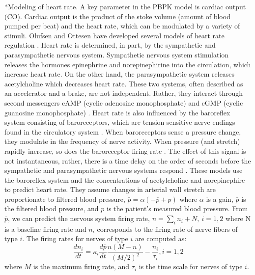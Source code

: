 \documentclass[11pt]{article}
\makeatletter
\renewcommand\subsection{\@startsection
	{subsection}{2}{0mm}
	{-0.05in}
	{-0.5\baselineskip}
	{\normalfont\normalsize\bfseries}}
\makeatother
\begin{document}
\subsection*{Modeling of heart rate.}
A key parameter in the PBPK model is cardiac output (CO). Cardiac output is the product of the stoke volume (amount of blood pumped per beat) and the heart rate, which can be modulated by a variety of stimuli. Olufsen and Ottesen have developed several models of heart rate regulation \citep{olufsen2006modeling, ottesen1997modelling,olufsen2008modeling,olufsen2013practical}.
Heart rate is determined, in part, by the sympathetic and parasympathetic nervous system.
Sympathetic nervous system stimulation releases the hormones epinephrine and norepinephirine into the circulation, which increase heart rate.
On the other hand, the parasympathetic system releases acetylcholine which decreases heart rate.
These two systems, often described as an accelerator and a brake, are not independent.
Rather, they interact through second messengers cAMP (cyclic adenosine monophosphate) and cGMP (cyclic guanosine monophosphate) \citep{olshansky2008parasympathetic}.
Heart rate is also influenced by the baroreflex system consisting of baroreceptors, which are tension sensitive nerve endings found in the circulatory system \citep{ottesen1997modelling}.
When baroreceptors sense a pressure change, they modulate in the frequency of nerve activity.
When pressure (and stretch) rapidly increase, so does the baroreceptor firing rate \citep{negative1999reflexes}.
The effect of this signal is not instantaneous, rather, there is a time delay on the order of seconds before the sympathetic and parasympathetic nervous systems respond \citep{ottesen1997modelling}. These models use the baroreflex system and the concentrations of acetylcholine and norepinephire to predict heart rate.
They assume changes in arterial wall stretch are proportionate to filtered blood pressure, $\dot{\bar{p}} = \alpha(-\bar p + p)$
where $\alpha$ is a gain, $\bar p$ is the filtered blood pressure, and $p$ is the patient's measured blood pressure.
From $\bar p$, we can predict the nervous system firing rate, $n = \sum_i n_i + N,~i = 1,2$
where N is a baseline firing rate and $n_i$ corresponds to the firing rate of nerve fibers of type $i$.
The firing rates for nerves of type $i$ are computed as:
\begin{equation}
\frac{dn_i}{dt} = \kappa_i \frac{d \bar p}{dt} \frac{n(M-n)}{(M/2)^2}-\frac{n_i}{\tau_i}, i = 1,2
\end{equation}
where $M$ is the maximum firing rate, and $\tau_i$ is the time scale for nerves of type $i$.
\end{document}

